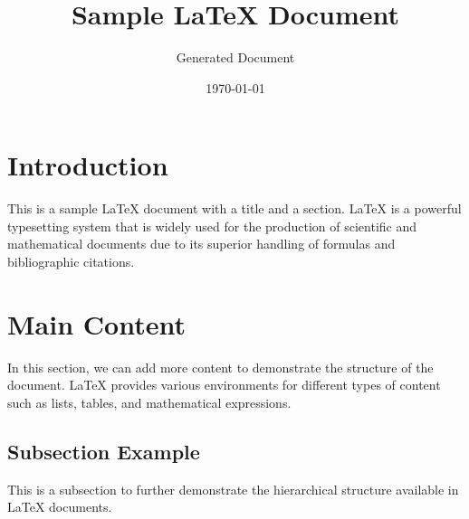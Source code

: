 \documentclass{article}
\title{Sample LaTeX Document}
\author{Generated Document}
\date{\today}
\begin{document}
\maketitle

\section{Introduction}
This is a sample LaTeX document with a title and a section. LaTeX is a powerful typesetting system that is widely used for the production of scientific and mathematical documents due to its superior handling of formulas and bibliographic citations.

\section{Main Content}
In this section, we can add more content to demonstrate the structure of the document. LaTeX provides various environments for different types of content such as lists, tables, and mathematical expressions.

\subsection{Subsection Example}
This is a subsection to further demonstrate the hierarchical structure available in LaTeX documents.
\end{document}

